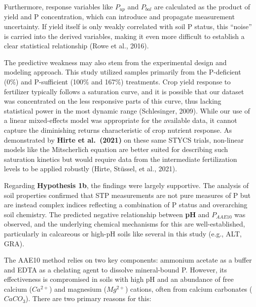 \documentclass[
  a4paper,
]{article}
\begin{document}
Furthermore, response variables like \(P_{up}\) and \(P_{bal}\) are
calculated as the product of yield and P concentration, which can
introduce and propagate measurement uncertainty. If yield itself is only
weakly correlated with soil P status, this ``noise'' is carried into the
derived variables, making it even more difficult to establish a clear
statistical relationship (Rowe et al., 2016).

The predictive weakness may also stem from the experimental design and
modeling approach. This study utilized samples primarily from the
P-deficient (0\%) and P-sufficient (100\% and 167\%) treatments. Crop
yield response to fertilizer typically follows a saturation curve, and
it is possible that our dataset was concentrated on the less responsive
parts of this curve, thus lacking statistical power in the most dynamic
range (Schlesinger, 2009). While our use of a linear mixed-effects model
was appropriate for the available data, it cannot capture the
diminishing returns characteristic of crop nutrient response. As
demonstrated by \textbf{Hirte et al.~(2021)} on these same STYCS trials,
non-linear models like the Mitscherlich equation are better suited for
describing such saturation kinetics but would require data from the
intermediate fertilization levels to be applied robustly (Hirte,
Stüssel, et al., 2021).

Regarding \textbf{Hypothesis 1b}, the findings were largely supportive.
The analysis of soil properties confirmed that STP measurements are not
pure measures of P but are instead complex indices reflecting a
combination of P status and overarching soil chemistry. The predicted
negative relationship between \textbf{pH} and \(P_{AAE10}\) was
observed, and the underlying chemical mechanisms for this are
well-established, particularly in calcareous or high-pH soils like
several in this study (e.g., ALT, GRA).

The AAE10 method relies on two key components: ammonium acetate as a
buffer and EDTA as a chelating agent to dissolve mineral-bound P.
However, its effectiveness is compromised in soils with high pH and an
abundance of free calcium (\(Ca^{2+}\)) and magnesium (\(Mg^{2+}\))
cations, often from calcium carbonates (\(CaCO_3\)). There are two
primary reasons for this:
\end{document}
